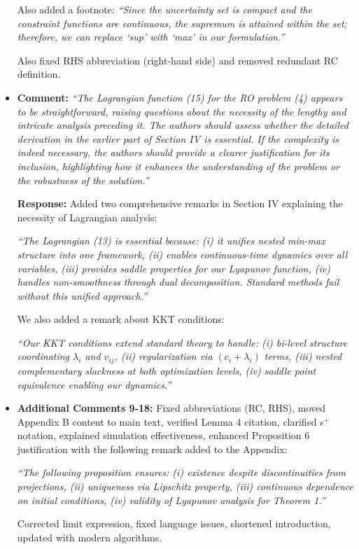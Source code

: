 \documentclass[journal,twoside,web]{ieeecolor}
\begin{document}
\begin{itemize}
Also added a footnote: {\color{revisionblue}\textit{``Since the uncertainty set is compact and the constraint functions are continuous, the supremum is attained within the set; therefore, we can replace `sup' with `max' in our formulation.''}}

Also fixed RHS abbreviation (right-hand side) and removed redundant RC definition.

\item  \textbf{Comment:} \textit{``The Lagrangian function (15) for the RO problem (4) appears to be straightforward, raising questions about the necessity of the lengthy and intricate analysis preceding it. The authors should assess whether the detailed derivation in the earlier part of Section IV is essential. If the complexity is indeed necessary, the authors should provide a clearer justification for its inclusion, highlighting how it enhances the understanding of the problem or the robustness of the solution.''}

\textbf{Response:} Added two comprehensive remarks in Section IV explaining the necessity of Lagrangian analysis:

{\color{revisionblue}\textit{``The Lagrangian (13) is essential because: (i) it unifies nested min-max structure into one framework, (ii) enables continuous-time dynamics over all variables, (iii) provides saddle properties for our Lyapunov function, (iv) handles non-smoothness through dual decomposition. Standard methods fail without this unified approach.''}}

We also added a remark about KKT conditions:

{\color{revisionblue}\textit{``Our KKT conditions extend standard theory to handle: (i) bi-level structure coordinating $\lambda_i$ and $v_{ij}$, (ii) regularization via $(c_i + \lambda_i)$ terms, (iii) nested complementary slackness at both optimization levels, (iv) saddle point equivalence enabling our dynamics.''}}\\

\item  \textbf{Additional Comments 9-18:} Fixed abbreviations (RC, RHS), moved Appendix B content to main text, verified Lemma 4 citation, clarified $\epsilon^+$ notation, explained simulation effectiveness, enhanced Proposition 6 justification with the following remark added to the Appendix:

{\color{revisionblue}\textit{``The following proposition ensures: (i) existence despite discontinuities from projections, (ii) uniqueness via Lipschitz property, (iii) continuous dependence on initial conditions, (iv) validity of Lyapunov analysis for Theorem 1.''}}

Corrected limit expression, fixed language issues, shortened introduction, updated with modern algorithms.

\end{itemize}
\end{document}
